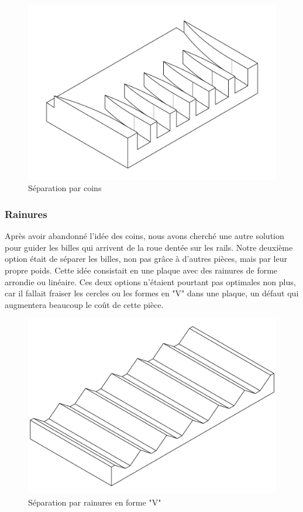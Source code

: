 \begin{figure}
    \centering
    \includegraphics[width=\textwidth]{Graphics/Rails/COINS.pdf}
    \caption{Séparation par coins}
\end{figure}

\subsubsection{Rainures}
Après avoir abandonné l'idée des coins, nous avons cherché une autre solution pour guider les billes qui arrivent de la roue dentée sur les rails. Notre deuxième option était de séparer les billes, non pas grâce à d'autres pièces, mais par leur propre poids. Cette idée consistait en une plaque avec des rainures de forme arrondie ou linéaire. Ces deux options n'étaient pourtant pas optimales non plus, car il fallait fraiser les cercles ou les formes en "V" dans une plaque, un défaut qui augmentera beaucoup le coût de cette pièce.

\begin{figure}
    \centering
    \includegraphics[width=\textwidth]{Graphics/Rails/SEPARATEUR_V.pdf}
    \caption{Séparation par rainures en forme "V"}
\end{figure}

